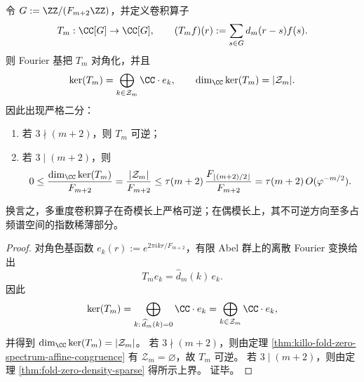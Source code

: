 \begin{corollary}\label{cor:killo-fold-multiplicity-convolution-invertibility-defect}
令 \(G:=\ZZ/(F_{m+2}\ZZ)\)，并定义卷积算子
\[
T_m:\CC[G]\to \CC[G],
\qquad
(T_mf)(r):=\sum_{s\in G}d_m(r-s)f(s).
\]
则 Fourier 基把 \(T_m\) 对角化，并且
\[
\ker(T_m)
=
\bigoplus_{k\in \mathcal Z_m}\CC\cdot e_k,
\qquad
\dim_{\CC}\ker(T_m)=|\mathcal Z_m|.
\]
因此出现严格二分：
\begin{enumerate}
\normalfont
  \item 若 \(3\nmid(m+2)\)，则 \(T_m\) 可逆；
  \item 若 \(3\mid(m+2)\)，则
  \[
  0\le
  \frac{\dim_{\CC}\ker(T_m)}{F_{m+2}}
  =
  \frac{|\mathcal Z_m|}{F_{m+2}}
  \le
  \tau(m+2)\,\frac{F_{\lfloor (m+2)/2\rfloor}}{F_{m+2}}
  =
  \tau(m+2)\,O(\varphi^{-m/2}).
  \]
\end{enumerate}
换言之，多重度卷积算子在奇模长上严格可逆；在偶模长上，其不可逆方向至多占频谱空间的指数稀薄部分。
\end{corollary}
\begin{proof}
对角色基函数 \(e_k(r):=e^{2\pi i kr/F_{m+2}}\)，有限 Abel 群上的离散 Fourier 变换给出
\[
T_me_k=\widehat d_m(k)\,e_k.
\]
因此
\[
\ker(T_m)=\bigoplus_{k:\,\widehat d_m(k)=0}\CC\cdot e_k
=
\bigoplus_{k\in \mathcal Z_m}\CC\cdot e_k,
\]
并得到 \(\dim_{\CC}\ker(T_m)=|\mathcal Z_m|\)。
若 \(3\nmid(m+2)\)，则由定理 \ref{thm:killo-fold-zero-spectrum-affine-congruence} 有 \(\mathcal Z_m=\varnothing\)，故 \(T_m\) 可逆。
若 \(3\mid(m+2)\)，则由定理 \ref{thm:fold-zero-density-sparse} 得所示上界。
证毕。
\end{proof}

\endinput

